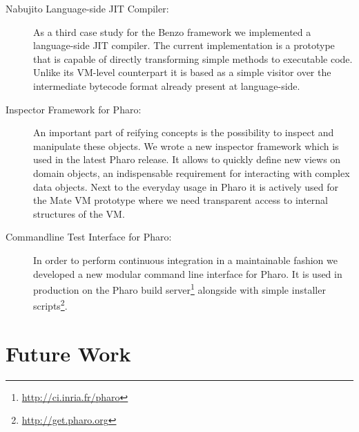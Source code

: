 \begin{description}
	\item[Nabujito Language-side JIT Compiler:]
As a third case study for the Benzo framework we implemented a language-side JIT compiler. 
The current implementation is a prototype that is capable of directly transforming simple methods to executable code.
Unlike its VM-level counterpart it is based as a simple visitor over the intermediate bytecode format already present at language-side.

	\item[Inspector Framework for Pharo:] 
An important part of reifying concepts is the possibility to inspect and manipulate these objects.
We wrote a new inspector framework which is used in the latest Pharo release.
It allows to quickly define new views on domain objects, an indispensable requirement for interacting with complex data objects.
Next to the everyday usage in Pharo it is actively used for the Mate VM prototype where we need transparent access to internal structures of the VM.

	\item[Commandline Test Interface for Pharo:]
In order to perform continuous integration in a maintainable fashion we developed a new modular command line interface for Pharo. 
It is used in production on the Pharo build server\footnote{\url{http://ci.inria.fr/pharo}} alongside with simple installer scripts\footnote{\url{http://get.pharo.org}}.
\end{description}


\section{Future Work}

